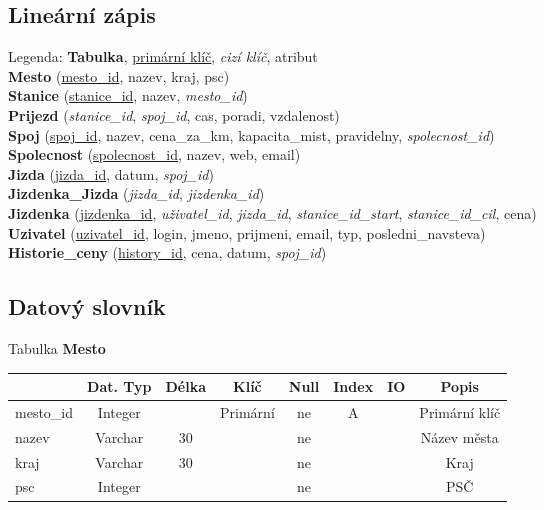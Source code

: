 \documentclass[11pt]{article}
\begin{document}
\subsection{Lineární zápis}
Legenda: \textbf{Tabulka}, \underline{primární klíč}, \textit{cizí klíč}, atribut\\
\noindent
\textbf{Mesto} (\underline{mesto\_id}, nazev, kraj, psc)\\
\textbf{Stanice} (\underline{stanice\_id}, nazev, \textit{mesto\_id})\\
\textbf{Prijezd} (\textit{stanice\_id}, \textit{spoj\_id}, cas, poradi, vzdalenost)\\
\textbf{Spoj} (\underline{spoj\_id}, nazev, cena\_za\_km, kapacita\_mist, pravidelny, \textit{spolecnost\_id})\\
\textbf{Spolecnost} (\underline{spolecnost\_id}, nazev, web, email)\\
\textbf{Jizda} (\underline{jizda\_id}, datum, \textit{spoj\_id})\\
\textbf{Jizdenka\_Jizda} (\textit{jizda\_id}, \textit{jizdenka\_id})\\
\textbf{Jizdenka} (\underline{jizdenka\_id}, \textit{uživatel\_id}, \textit{jizda\_id}, \textit{stanice\_id\_start}, \textit{stanice\_id\_cil}, cena)\\
\textbf{Uzivatel} (\underline{uzivatel\_id}, login, jmeno, prijmeni, email, typ, posledni\_navsteva)\\
\textbf{Historie\_ceny} (\underline{history\_id}, cena, datum, \textit{spoj\_id})\\

\subsection{Datový slovník}

Tabulka \textbf{Mesto}

\begin{table}[H]
    \begin{tabular}{|l|c|c|c|c|c|c|c|} \hline
                & Dat. Typ  & Délka & Klíč      & Null  & Index & IO    & Popis \\ \hline
    mesto\_id   & Integer   &       & Primární  & ne    & A     &       & Primární klíč \\ \hline
    nazev       & Varchar   & 30    &           & ne    &       &       & Název města \\ \hline
    kraj        & Varchar   & 30    &           & ne    &       &       & Kraj \\ \hline
    psc         & Integer   &       &           & ne    &       &       & PSČ \\ \hline
    \end{tabular}
\end{table}
\end{document}
